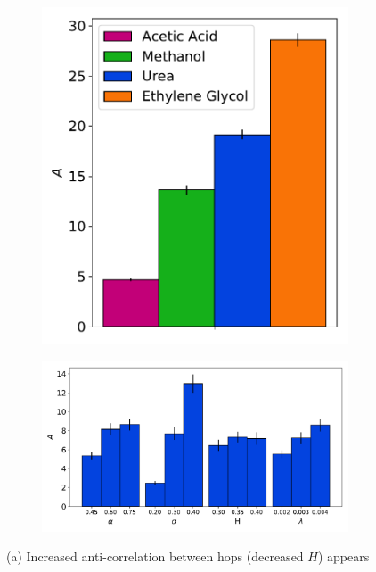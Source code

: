\documentclass[journal=jctcce,manuscript=article]{achemso}
\begin{document}
\begin{figure}
\begin{subfigure}{0.31\textwidth}
  \includegraphics[width=\textwidth]{c_parameter_comparison.pdf}
  \caption{}\label{fig:c_parameters}
  \end{subfigure}
  \begin{subfigure}{0.66\textwidth}
  \includegraphics[width=\textwidth]{c_influence.pdf}
  \caption{}\label{fig:c_influence}
  \end{subfigure}
  \vspace{-.5cm}
  \caption{(a) Increased anti-correlation between hops (decreased $H$) appears
}
\end{figure}
\end{document}
